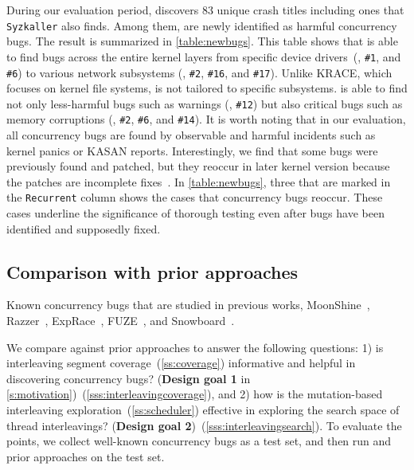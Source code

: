 %
During our evaluation period, \sys discovers 83 unique crash titles including
ones that \texttt{Syzkaller} also finds. Among them, \totalbugs are
newly identified as harmful concurrency bugs. The result is summarized in
\autoref{table:newbugs}.
%
This table shows that \sys is able to find bugs across the entire
kernel layers from specific device drivers~(\eg, \texttt{\#1}, and
\texttt{\#6}) to various network subsystems (\eg, \texttt{\#2},
\texttt{\#16}, and \texttt{\#17}). 
Unlike KRACE, which focuses on 
kernel file systems, \sys is not tailored to specific subsystems.
%
\sys is able to find not only less-harmful bugs such as warnings
(\eg, \texttt{\#12}) but also critical bugs such as memory corruptions
(\eg, \texttt{\#2}, \texttt{\#6}, and \texttt{\#14}).
%
It is worth noting that in our evaluation, all concurrency bugs are
found by observable and harmful incidents such as kernel panics or
KASAN reports.
%
Interestingly, we find that some bugs were previously found and
patched, but they reoccur in later kernel version because the patches are
incomplete fixes~\cite{learningfrommistakes}.
%
In \autoref{table:newbugs}, three that are marked in the
\texttt{Recurrent} column shows the cases that concurrency bugs reoccur.
%
These cases underline the significance of thorough testing even after 
bugs have been identified and supposedly fixed.

\subsection{Comparison with prior approaches}
\label{ss:comparison}

\begin{table}[t]
  
  \centering
  \caption{Known concurrency bugs that are studied in previous works,
    MoonShine~\cite{moonshine}, Razzer~\cite{razzer},
    ExpRace~\cite{exprace}, FUZE~\cite{fuze}, and
    Snowboard~\cite{snowboard}.}
  \label{table:knownbugs}
  \vspace{-8pt}
\end{table}

We compare \sys against prior approaches to answer the following
questions: 1) is interleaving segment
coverage~(\autoref{ss:coverage}) informative and helpful in
discovering concurrency bugs?  (\textbf{Design goal 1} in
\autoref{s:motivation})~(\autoref{sss:interleavingcoverage}), and
%
2) how is the mutation-based interleaving
exploration~(\autoref{ss:scheduler}) effective in exploring the search
space of thread interleavings? (\textbf{Design goal
  2})~(\autoref{sss:interleavingsearch}).
%
To evaluate the points, we collect well-known concurrency bugs as a test set, 
and then run \sys and prior approaches on the test set.

